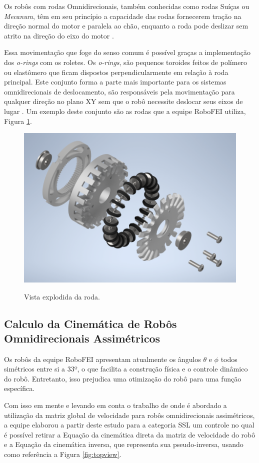 \documentclass[a4paper,10pt,twocolumn,fleqn]{article}
\begin{document}
    Os robôs com rodas Omnidirecionais, também conhecidas como rodas Suíças ou \textit{Mecanum}, têm em seu princípio a capacidade das rodas fornecerem tração na direção normal do motor e paralela ao chão, enquanto a roda pode deslizar sem atrito na direção do eixo do motor \cite{kinematic}.
    
    Essa movimentação que foge do senso comum é possível graças a implementação dos \textit{o-rings} com os roletes. Os \textit{o-rings}, são pequenos toroides feitos de polímero ou elastômero que ficam dispostos perpendicularmente em relação à roda principal. Este conjunto forma a parte mais importante para os sistemas omnidirecionais de deslocamento, são responsáveis pela movimentação para qualquer direção no plano XY sem que o robô necessite deslocar seus eixos de lugar \cite{kinematic}. Um exemplo deste conjunto são as rodas que a equipe RoboFEI utiliza, Figura \ref{fig:rodaExplodida}.

    \begin{figure}[!htb]
        \centering
        \caption{Vista explodida da roda.}
        \includegraphics[width=0.7\linewidth]{VistaExplodidaRodaMontada.png}
        \label{fig:rodaExplodida}
    \end{figure}
    
    \subsection{Calculo da Cinemática de Robôs Omnidirecionais Assimétricos}
    
    Os robôs da equipe RoboFEI apresentam atualmente os ângulos $\theta$ e $\phi$ todos simétricos entre si a 33º, o que facilita a construção física e o controle dinâmico do robô. Entretanto, isso prejudica uma otimização do robô para uma função específica. 

    Com isso em mente e levando em conta o trabalho de \cite{rojas2005omnidirectional} onde é abordado a utilização da matriz global de velocidade para robôs omnidirecionais assimétricos, a equipe \cite{Twente} elaborou a partir deste estudo para a categoria SSL um controle no qual é possível retirar a Equação da cinemática direta da matriz de velocidade do robô e a Equação da cinemática inversa,  que representa sua pseudo-inversa, usando como referência a Figura \ref{fig:topview}.
\end{document}
